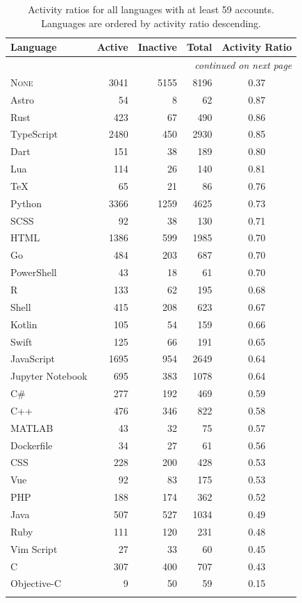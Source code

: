 \documentclass[12pt,a4paper]{article}
\begin{document}
\begin{longtable}{lrrrc}
\toprule
Language & Active & Inactive & Total & Activity Ratio \\
\midrule
\endhead
\midrule
\multicolumn{5}{r}{\small\itshape continued on next page}\\
\endfoot
\bottomrule
\endlastfoot
\textsc{None}      & 3041 & 5155 & 8196 & 0.37 \\
Astro              &   54 &    8 &   62 & 0.87 \\
Rust               &  423 &   67 &  490 & 0.86 \\
TypeScript         & 2480 &  450 & 2930 & 0.85 \\
Dart               &  151 &   38 &  189 & 0.80 \\
Lua                &  114 &   26 &  140 & 0.81 \\
TeX                &   65 &   21 &   86 & 0.76 \\
Python             & 3366 & 1259 & 4625 & 0.73 \\
SCSS               &   92 &   38 &  130 & 0.71 \\
HTML               & 1386 &  599 & 1985 & 0.70 \\
Go                 &  484 &  203 &  687 & 0.70 \\
PowerShell         &   43 &   18 &   61 & 0.70 \\
R                  &  133 &   62 &  195 & 0.68 \\
Shell              &  415 &  208 &  623 & 0.67 \\
Kotlin             &  105 &   54 &  159 & 0.66 \\
Swift              &  125 &   66 &  191 & 0.65 \\
JavaScript         & 1695 &  954 & 2649 & 0.64 \\
Jupyter Notebook   &  695 &  383 & 1078 & 0.64 \\
C\#                &  277 &  192 &  469 & 0.59 \\
C++                &  476 &  346 &  822 & 0.58 \\
MATLAB             &   43 &   32 &   75 & 0.57 \\
Dockerfile         &   34 &   27 &   61 & 0.56 \\
CSS                &  228 &  200 &  428 & 0.53 \\
Vue                &   92 &   83 &  175 & 0.53 \\
PHP                &  188 &  174 &  362 & 0.52 \\
Java               &  507 &  527 & 1034 & 0.49 \\
Ruby               &  111 &  120 &  231 & 0.48 \\
Vim Script         &   27 &   33 &   60 & 0.45 \\
C                  &  307 &  400 &  707 & 0.43 \\
Objective-C        &    9 &   50 &   59 & 0.15 \\
\caption{Activity ratios for all languages with at least 59 accounts.
Languages are ordered by activity ratio descending.}
\label{tab:activity}
\end{longtable}
\end{document}
